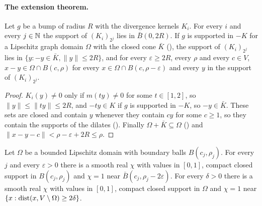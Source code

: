 \paragraph{The extension theorem.}

\begin{lemma}
\label{lem:divergence-kernel-supports}
\leanok
{}
Let $g$ be a bump of radius $R$ with the divergence kernels $K_i$. For every $i$ and every
$j \in \mathbb{N}$ the support of $(K_i)_{2^j}$ lies in $\bar B(0, 2R)$. If $g$ is supported in $-K$ for a
Lipschitz graph domain $\Omega$ with the closed cone $\bar K$ (), the support
of $(K_i)_{2^j}$ lies in $\{y : -y \in \bar K, \|y\| \leq 2R\}$, and for every
$\varepsilon \geq 2R$,
every $\rho$ and every $c \in V$, $x - y \in \Omega \cap B(c, \rho)$ for every
$x \in \Omega \cap B(c, \rho - \varepsilon)$ and every $y$ in the support of $(K_i)_{2^j}$.
\end{lemma}

\begin{proof}
\leanok
$K_i(y) \neq 0$ only if $m(t y) \neq 0$ for some $t \in [1, 2]$, so $\|y\| \leq \|t y\| \leq 2R$,
and $-t y \in K$ if $g$ is supported in $-K$, so $-y \in \bar K$. These sets are closed and
contain $y$ whenever they contain $c y$ for some $c \geq 1$, so they contain the supports of the
dilates (). Finally $\Omega + \bar K \subseteq \Omega$
() and
$\|x - y - c\| < \rho - \varepsilon + 2R \leq \rho$.
\end{proof}

\begin{lemma}
\label{lem:patch-cutoffs}
\leanok
{}
Let $\Omega$ be a bounded Lipschitz domain with boundary balls $B(c_j, \rho_j)$. For every $j$
and every $\varepsilon > 0$ there is a smooth real $\chi$ with values in $[0, 1]$, compact closed
support in $B(c_j, \rho_j)$ and $\chi = 1$ near $\bar B(c_j, \rho_j - 2 \varepsilon)$. For every
$\delta > 0$ there is a smooth real $\chi$ with values in $[0, 1]$, compact closed support in
$\Omega$ and $\chi = 1$ near $\{x : \operatorname{dist}(x, V \setminus \Omega) \geq 2 \delta\}$.
\end{lemma}

